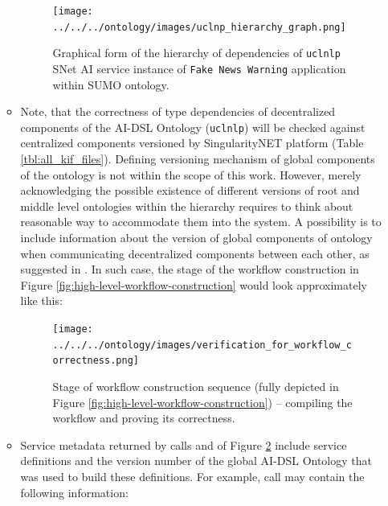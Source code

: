 \documentclass[]{report}
\begin{document}
\begin{enumerate}
\begin{itemize}
\begin{figure}[H]
	\centering
	\texttt{[image: ../../../ontology/images/uclnp\_hierarchy\_graph.png]}
	\captionsetup{width=0.9\linewidth}
	\caption{\label{fig:uclnlp_hierarchy_graph}Graphical form of the hierarchy of 
	dependencies of \texttt{uclnlp} SNet AI service instance of \texttt{Fake News Warning} 
	application within SUMO ontology.}
\end{figure}


	\item Note, that the correctness of type dependencies of decentralized components of 
	the AI-DSL Ontology (\texttt{uclnlp}) will be checked against centralized
	components versioned by SingularityNET platform (Table \ref{tbl:all_kif_files}). Defining
	versioning mechanism of global components of the ontology is not within the scope 
	of this work. However, merely acknowledging the possible existence of different 
	versions of root and middle level ontologies within the hierarchy requires to 
	think about reasonable way to accommodate them into the system. A possibility 
	is to include information about the version of global components of ontology when 
	communicating decentralized components between each other, 
	as suggested in \cite{YvesHellenschmidt2002}. 
	In such case, the stage  of the workflow construction 
	in Figure \ref{fig:high-level-workflow-construction} would look approximately like this:
	
\begin{figure}[H]
	\centering
	\texttt{[image: ../../../ontology/images/verification\_for\_workflow\_correctness.png]}
	\captionsetup{width=0.9\linewidth}
	\caption{\label{fig:verification-sequence}Stage  of workflow construction 
		sequence (fully depicted in Figure \ref{fig:high-level-workflow-construction}) -- compiling the workflow and
		proving its correctness.}
\end{figure}

	\item Service metadata returned by calls  and
           of Figure \ref{fig:verification-sequence} include service definitions
	and the version number of the global AI-DSL Ontology that was used to build these definitions. For
	example, call  may contain the following information:


\end{itemize}
\end{enumerate}
\end{document}
